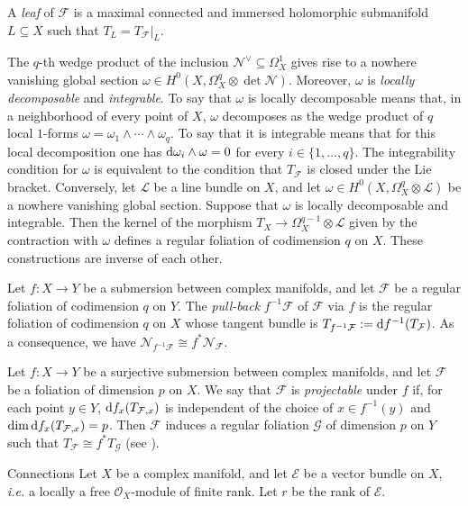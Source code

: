 \documentclass[english,10pt]{amsart}
\makeatletter
\renewcommand\subsection{\@startsection{subsection}{2}%
  \z@{.5\linespacing\@plus.7\linespacing}{-.5em}%
  {\normalfont\sffamily}}
\newcommand{\cF}{\mathcal{F}}
\newcommand{\cG}{\mathcal{G}}
\newcommand{\sE}{\mathscr{E}}
\newcommand{\sL}{\mathscr{L}}
\newcommand{\sN}{\mathscr{N}}
\newcommand{\sO}{\mathscr{O}}
\newcommand{\dd}{\textup{d}}
\theoremstyle{definition}
\theoremstyle{remark}
\numberwithin{equation}{section}
\makeatother
\begin{document}
\medskip

A \emph{leaf} of $\cF$ is a maximal connected and immersed holomorphic submanifold $L \subseteq X$ such that
$T_L=T_\cF|_L$.

\medskip

The $q$-th wedge product of the inclusion $\sN^\vee\subseteq \Omega^1_X$ gives rise to a nowhere vanishing global section $\omega\in H^0(X,\Omega^{q}_X\otimes \det\sN)$. Moreover, $\omega$ is \emph{locally decomposable} and \emph{integrable}. To say that $\omega$ is locally decomposable means that, in a neighborhood of every point of $X$, $\omega$ decomposes as the wedge product of $q$ local $1$-forms $\omega=\omega_1\wedge\cdots\wedge\omega_q$.
To say that it is integrable means that for this local decomposition one has $\dd\omega_i\wedge \omega=0$ for every  $i\in\{1,\ldots,q\}$. The integrability condition for $\omega$ is equivalent to the condition that $T_\cF$ 
is closed under the Lie bracket. Conversely, let $\sL$ be a line bundle on $X$, and let $\omega\in H^0(X,\Omega^{q}_X\otimes \sL)$ be a nowhere vanishing global section. Suppose that $\omega$ is locally decomposable and integrable. Then the kernel of the morphism $T_X \to \Omega^{q-1}_X\otimes \sL$ given by the contraction with $\omega$ defines a regular foliation of codimension $q$ on $X$. These constructions are inverse of each other. 

\medskip

Let $f \colon X \to Y$ be a submersion between complex manifolds, and let $\cF$ be a regular foliation of codimension $q$ on $Y$. The \emph{pull-back} $f^{-1}\cF$ of $\cF$ via $f$ is the regular foliation of codimension $q$ on $X$ whose tangent bundle is $T_{f^{-1}\cF}:=\dd f^{-1}(T_\cF)$. As a consequence, we have $\sN_{f^{-1}\cF}\cong f^*\sN_\cF$.

\medskip

Let $f \colon X \to Y$ be a surjective submersion between complex manifolds, and let $\cF$ be a foliation of dimension $p$ on $X$. We say that $\cF$ is \emph{projectable} under $f$ if, for each point $y \in Y$, $\dd f_x(T_{\cF,x})$ is independent of the choice of $x \in f^{-1}(y)$ and $\dim \dd f_x (T_{\cF,x}) = p$. Then $\cF$ induces a regular foliation $\cG$ of dimension $p$ on $Y$ such that $T_\cF \cong f^*T_\cG$ (see \cite[Paragraph 2.7]{druel_bbcd2}).

\subsection{Connections}\label{paragraph:connections} 
Let $X$ be a complex manifold, and let $\sE$ be a vector bundle on $X$, \emph{i.e.} a locally a free $\sO_X$-module of finite rank. Let $r$ be the rank of $\sE$.
\end{document}
